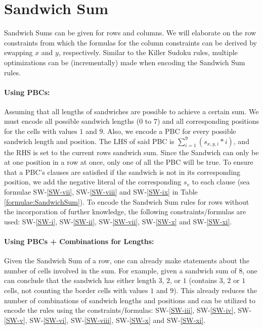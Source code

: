 \FloatBarrier
\newpage
\section{Sandwich Sum}
Sandwich Sums can be given for rows and columns. We will elaborate on the row constraints from which the formulas for the column constraints can be derived by swapping $x$ and $y$, respectively. Similar to the Killer Sudoku rules, multiple optimizations can be (incrementally) made when encoding the Sandwich Sum rules.

\paragraph{Using PBCs:} Assuming that all lengths of sandwiches are possible to achieve a certain sum. We must encode all possible sandwich lengths ($0$ to $7$) and all corresponding positions for the cells with values $1$ and $9$. Also, we encode a PBC for every possible sandwich length and position. The LHS of said PBC is $\sum_{i=1}^{9} (s_{x,y,i}*i)$, and the RHS is set to the current rows sandwich sum. Since the Sandwich can only be at one position in a row at once, only one of all the PBC will be true. To ensure that a PBC's clauses are satisfied if the sandwich is not in its corresponding position, we add the negative literal of the corresponding $s_v$ to each clause (sea formulae SW-\ref{SW-vii}, SW-\ref{SW-viii} and SW-\ref{SW-ix} in Table \ref{formulae:SandwichSum}). To encode the Sandwich Sum rules for rows without the incorporation of further knowledge, the following constraints/formulas are used: SW-\ref{SW-i}, SW-\ref{SW-ii}, SW-\ref{SW-vii}, SW-\ref{SW-x} and SW-\ref{SW-xi}.

\paragraph{Using PBCs + Combinations for Lengths:} Given the Sandwich Sum of a row, one can already make statements about the number of cells involved in the sum. For example, given a sandwich sum of $8$, one can conclude that the sandwich has either length $3$, $2$, or $1$ (contains $3$, $2$ or $1$ cells, not counting the border cells with values $1$ and $9$). This already reduces the number of combinations of sandwich lengths and positions and can be utilized to encode the rules using the constraints/formulas: SW-\ref{SW-iii}, SW-\ref{SW-iv}, SW-\ref{SW-v}, SW-\ref{SW-vi}, SW-\ref{SW-viii}, SW-\ref{SW-x} and SW-\ref{SW-xi}.

